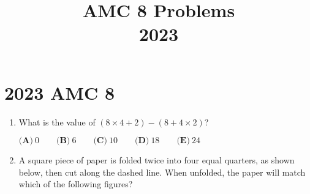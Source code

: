 \documentclass{article}
\title{AMC 8 Problems \\ 2023}
\date{}
\begin{document}
\maketitle\thispagestyle{fancy}\newpage\section*{2023 AMC 8}\begin{enumerate}[label=\arabic*., itemsep=0.5em]\item What is the value of \((8 \times 4 + 2) - (8 + 4 \times 2)\)?

\(\textbf{(A)}\ 0 \qquad \textbf{(B)}\ 6 \qquad \textbf{(C)}\ 10 \qquad \textbf{(D)}\ 18 \qquad \textbf{(E)}\ 24\)\par \vspace{0.5em}\item A square piece of paper is folded twice into four equal quarters, as shown below, then cut along the dashed line. When unfolded, the paper will match which of the following figures?


\end{enumerate}
\end{document}
